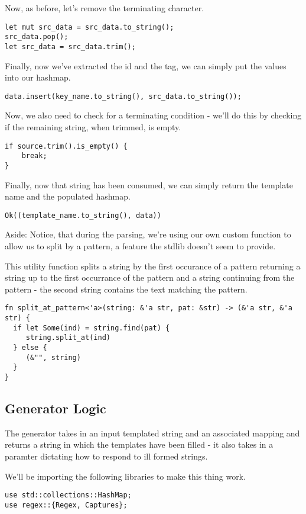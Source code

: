 \documentclass[11pt]{article}
\begin{document}
Now, as before, let's remove the terminating character.
\begin{verbatim}
let mut src_data = src_data.to_string();
src_data.pop();
let src_data = src_data.trim();
\end{verbatim}

Finally, now we've extracted the id and the tag, we can simply put the values into our hashmap.
\begin{verbatim}
data.insert(key_name.to_string(), src_data.to_string());
\end{verbatim}

Now, we also need to check for a terminating condition - we'll do this by checking if the remaining string, when trimmed, is empty.
\begin{verbatim}
if source.trim().is_empty() {
    break;
}
\end{verbatim}

Finally, now that string has been consumed, we can simply return the template name and the populated hashmap.

\begin{verbatim}
Ok((template_name.to_string(), data))
\end{verbatim}

Aside: Notice, that during the parsing, we're using our own custom function to allow us to split by a pattern, a feature the
stdlib doesn't seem to provide.

This utility function splits a string by the first occurance of a pattern returning a string up to the first occurrance 
of the pattern and a string continuing from the pattern - the second string contains the text matching the pattern.
\begin{verbatim}
fn split_at_pattern<'a>(string: &'a str, pat: &str) -> (&'a str, &'a str) {
  if let Some(ind) = string.find(pat) {
     string.split_at(ind)
  } else {
     (&"", string)
  }
}
\end{verbatim}

\subsection{Generator Logic}
\label{sec:org7ecb46d}
The generator takes in an input templated string and an associated mapping and returns a string in which the templates have been filled - it also takes in a paramter dictating how to respond to ill formed strings.

We'll be importing the following libraries to make this thing work.
\begin{verbatim}
use std::collections::HashMap;
use regex::{Regex, Captures};
\end{verbatim}
\end{document}
